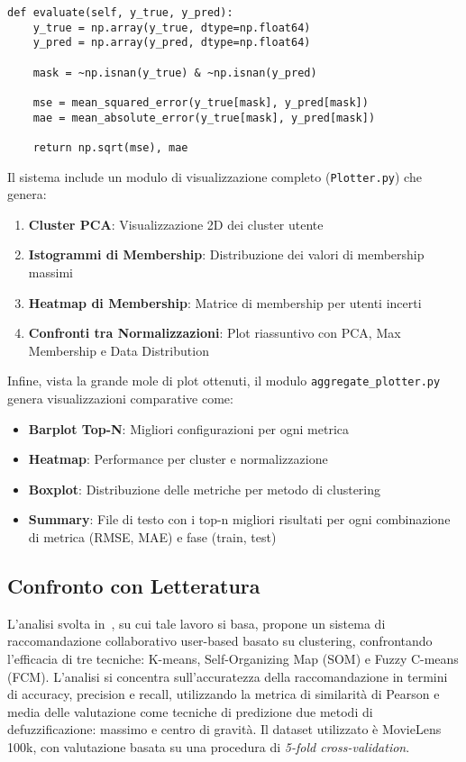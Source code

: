 \begin{lstlisting}[style=PythonStyle, caption=Calcolo metriche di valutazione]
def evaluate(self, y_true, y_pred):
    y_true = np.array(y_true, dtype=np.float64)
    y_pred = np.array(y_pred, dtype=np.float64)
    
    mask = ~np.isnan(y_true) & ~np.isnan(y_pred)
    
    mse = mean_squared_error(y_true[mask], y_pred[mask])
    mae = mean_absolute_error(y_true[mask], y_pred[mask])
    
    return np.sqrt(mse), mae
\end{lstlisting}

Il sistema include un modulo di visualizzazione completo (\texttt{Plotter.py}) che genera:

\begin{enumerate}
    \item \textbf{Cluster PCA}: Visualizzazione 2D dei cluster utente
    \item \textbf{Istogrammi di Membership}: Distribuzione dei valori di membership massimi
    \item \textbf{Heatmap di Membership}: Matrice di membership per utenti incerti
    \item \textbf{Confronti tra Normalizzazioni}: Plot riassuntivo con PCA, Max Membership e Data Distribution
\end{enumerate}

Infine, vista la grande mole di plot ottenuti, il modulo \texttt{aggregate\_plotter.py} genera visualizzazioni comparative come:

\begin{itemize}
    \item \textbf{Barplot Top-N}: Migliori configurazioni per ogni metrica
    \item \textbf{Heatmap}: Performance per cluster e normalizzazione
    \item \textbf{Boxplot}: Distribuzione delle metriche per metodo di clustering
    \item \textbf{Summary}: File di testo con i top-n migliori risultati per ogni combinazione di metrica (RMSE, MAE) e fase (train, test)
\end{itemize}

\subsection*{Confronto con Letteratura}

L'analisi svolta in~\cite{KOOHI2016134}, su cui tale lavoro si basa, propone un sistema di raccomandazione collaborativo user-based basato su clustering, confrontando l'efficacia di tre tecniche: K-means, Self-Organizing Map (SOM) e Fuzzy C-means (FCM). L’analisi si concentra sull’accuratezza della raccomandazione in termini di accuracy, precision e recall, utilizzando la metrica di similarità di Pearson  e media delle valutazione come tecniche di predizione due metodi di defuzzificazione: massimo e centro di gravità. Il dataset utilizzato è MovieLens 100k, con valutazione basata su una procedura di \textit{5-fold cross-validation}.

